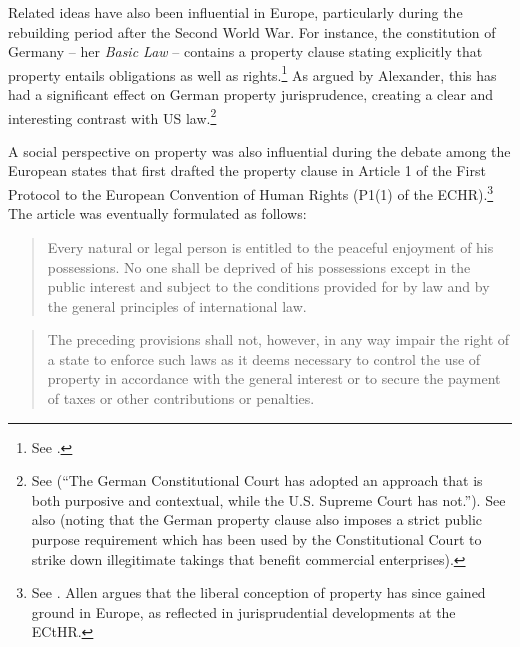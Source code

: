 Related ideas have also been influential in Europe, particularly during the rebuilding period after the Second World War. For instance, the constitution of Germany -- her {\it Basic Law} -- contains a property clause stating explicitly that property entails obligations as well as rights.\footnote{See \cite[14]{basic49}.} As argued by Alexander, this has had a significant effect on German property jurisprudence, creating a clear and interesting contrast with US law.\footnote{See \cite[738]{alexander03} (``The German Constitutional Court has adopted an approach that is both purposive and contextual, while the U.S. Supreme Court has not.''). See also \cite[476-483]{walt11} (noting that the German property clause also imposes a strict public purpose requirement which has been used by the Constitutional Court to strike down illegitimate takings that benefit commercial enterprises).}

A social perspective on property was also influential during the debate among the European states that first drafted the property clause in Article 1 of the First Protocol to the European Convention of Human Rights (P1(1) of the ECHR).\footnote{See \cite[1063-1065]{allen10}. Allen argues that the liberal conception of property has since gained ground in Europe, as reflected in jurisprudential developments at the ECtHR.} The article was eventually formulated as follows:

\begin{quote} Every natural or legal person is entitled to the peaceful enjoyment of his possessions. No one shall be deprived of his possessions except in the public interest and subject to the conditions provided for by law and by the general principles of international law.
\end{quote}
\begin{quote}
The preceding provisions shall not, however, in any way impair the right of a state to enforce such laws as it deems necessary to control the use of property in accordance with the general interest or to secure the payment of taxes or other contributions or penalties.
\end{quote}

